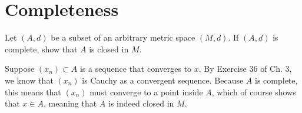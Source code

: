 \section{Completeness}

\begin{exercise}{12}
    Let $(A, d)$ be a subset of an arbitrary metric space \((M, d)\).
    If \((A, d)\) is complete, show that \(A\) is closed in \(M\).
\end{exercise}

\begin{solution}
    
    Suppose $(x_n) \subset A$ is a sequence that converges to $x$.
    By Exercise 36 of Ch. 3, we know that $(x_n)$ is Cauchy as a convergent sequence.
    Because $A$ is complete, this means that $(x_n)$ must converge to a point inside $A$, which of course shows that $x \in A$, meaning that $A$ is indeed closed in $M$.
\end{solution}